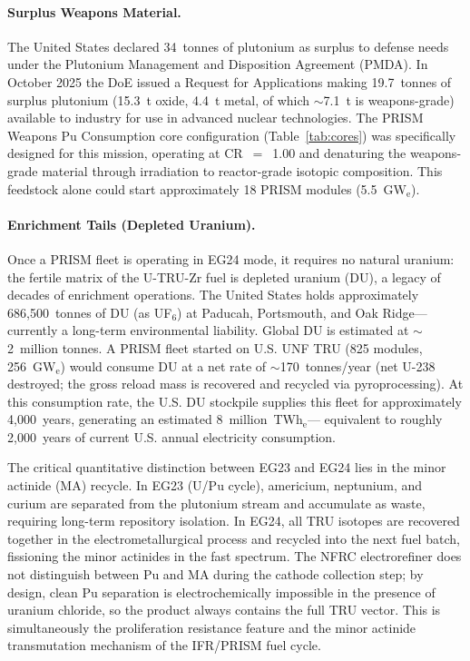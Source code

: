 \documentclass[10pt,twoside]{article}
\begin{document}
\paragraph{Surplus Weapons Material.}
The United States declared 34~tonnes of plutonium as surplus to defense
needs under the Plutonium Management and Disposition Agreement (PMDA).
In October 2025 the DoE issued a Request for Applications making
19.7~tonnes of surplus plutonium (15.3~t oxide, 4.4~t metal, of which
$\sim$7.1~t is weapons-grade) available to industry for use in
advanced nuclear technologies.\cite{DOE_Pu_FOA_2025}  The PRISM
Weapons Pu Consumption core configuration (Table~\ref{tab:cores})
was specifically designed for this mission, operating at CR~$=$~1.00
and denaturing the weapons-grade material through irradiation to
reactor-grade isotopic composition.  This feedstock alone could start
approximately 18 PRISM modules (5.5~GW$_\text{e}$).

\paragraph{Enrichment Tails (Depleted Uranium).}
Once a PRISM fleet is operating in EG24 mode, it requires no natural
uranium: the fertile matrix of the U-TRU-Zr fuel is depleted uranium
(DU), a legacy of decades of enrichment operations.  The United States
holds approximately 686{,}500~tonnes of DU (as UF$_6$) at Paducah,
Portsmouth, and Oak Ridge---currently a long-term environmental
liability.\cite{WNA_US_FC}  Global DU is estimated at $\sim$2~million
tonnes.\cite{WNA_Supply}  A PRISM fleet started on U.S. UNF TRU
(825 modules, 256~GW$_\text{e}$) would consume DU at a net rate of
$\sim$170~tonnes/year (net U-238 destroyed; the gross reload mass
is recovered and recycled via pyroprocessing).  At this consumption
rate, the U.S. DU stockpile supplies this fleet for approximately
4{,}000~years, generating an estimated 8~million~TWh$_\text{e}$---
equivalent to roughly 2{,}000~years of current U.S. annual
electricity consumption.

The critical quantitative distinction between EG23 and EG24 lies in the
minor actinide (MA) recycle.  In EG23 (U/Pu cycle), americium, neptunium,
and curium are separated from the plutonium stream and accumulate as
waste, requiring long-term repository isolation.  In EG24, all TRU
isotopes are recovered together in the electrometallurgical process
and recycled into the next fuel batch, fissioning the minor actinides
in the fast spectrum.  The NFRC electrorefiner does not distinguish
between Pu and MA during the cathode collection step; by design,
clean Pu separation is electrochemically impossible in the presence of
uranium chloride, so the product always contains the full TRU
vector.\cite{Till2011}  This is simultaneously the proliferation
resistance feature and the minor actinide transmutation mechanism
of the IFR/PRISM fuel cycle.
\end{document}
